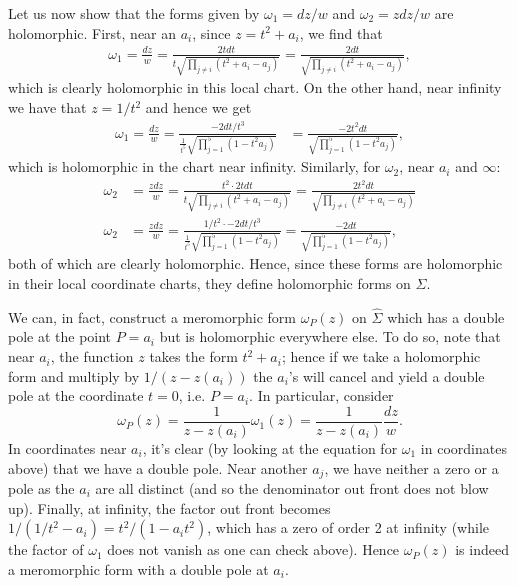 \documentclass{../mathnotes}
\begin{document}
Let us now show that the forms given by $\omega_1=dz/w$ and $\omega_2=zdz/w$ are holomorphic. First, near an $a_i$, since $z=t^2+a_i$, we find that
\begin{align*}
    \omega_1=\frac{dz}{w}=\frac{2tdt}{t\sqrt{\prod_{j\neq i}\left( t^2+a_i-a_j \right)}}=\frac{2dt}{\sqrt{\prod_{j\neq i}\left( t^2+a_i-a_j \right)}},
\end{align*}
which is clearly holomorphic in this local chart. On the other hand, near infinity we have that $z=1/t^2$ and hence we get
\begin{align*}
    \omega_1=\frac{dz}{w}=\frac{-2dt/t^3}{\frac{1}{t^5}\sqrt{\prod_{j=1}^5\left( 1-t^2a_j \right)}}&=\frac{-2t^2dt}{\sqrt{\prod_{j=1}^5(1-t^2a_j)}},
\end{align*}
which is holomorphic in the chart near infinity. Similarly, for $\omega_2$, near $a_i$ and $\infty$:
\begin{align*}
    \omega_2&=\frac{zdz}{w}=\frac{t^2\cdot 2tdt}{t\sqrt{\prod_{j\neq i}\left( t^2+a_i-a_j \right)}}=\frac{2t^2dt}{\sqrt{\prod_{j\neq i}\left( t^2+a_i-a_j \right)}}\\
    \omega_2&=\frac{zdz}{w}=\frac{1/t^2\cdot-2dt/t^3}{\frac{1}{t^5}\sqrt{\prod_{j=1}^5\left( 1-t^2a_j \right)}}=\frac{-2dt}{\sqrt{\prod_{j=1}^5(1-t^2a_j)}},
\end{align*}
both of which are clearly holomorphic. Hence, since these forms are holomorphic in their local coordinate charts, they define holomorphic forms on $\hat\Sigma$.

We can, in fact, construct a meromorphic form $\omega_P(z)$ on $\hat\Sigma$ which has a double pole at the point $P=a_i$ but is holomorphic everywhere else.
To do so, note that near $a_i$, the function $z$ takes the form $t^2+a_i$; hence if we take a holomorphic form and multiply by $1/(z-z(a_i))$ the $a_i$'s will
cancel and yield a double pole at the coordinate $t=0$, i.e. $P=a_i$. In particular, consider
\[\omega_P(z)=\frac{1}{z-z(a_i)}\omega_1(z)=\frac{1}{z-z(a_i)}\frac{dz}{w}.\]
In coordinates near $a_i$, it's clear (by looking at the equation for $\omega_1$ in coordinates above) that we have a double pole. Near another $a_j$, we
have neither a zero or a pole as the $a_i$ are all distinct (and so the denominator out front does not blow up). Finally, at infinity, the factor out front
becomes $1/\left( 1/t^2-a_i \right)=t^2/\left( 1-a_it^2 \right)$, which has a zero of order 2 at infinity (while the factor of $\omega_1$ does not vanish as
one can check above). Hence $\omega_P(z)$ is indeed a meromorphic form with a double pole at $a_i$.
\end{document}
